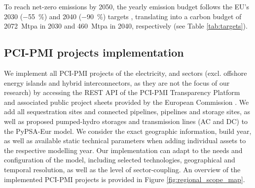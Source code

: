 \documentclass[preprint,12pt,sort&compress]{elsarticle}
\begin{document}
To reach net-zero  emissions by 2050, the yearly emission budget follows the EU's 2030 (\SI{-55}{\percent}) and 2040 (\SI{-90}{\percent}) targets \cite{europeancommissionFit55Delivering2021, europeancommission.directorategeneralforclimateaction.IndepthReportResults2024}, translating into a carbon budget of \SI{2072}{Mtpa} in 2030 and \SI{460}{Mtpa} in 2040, respectively (see Table \ref{tab:targets}).

\subsection{PCI-PMI projects implementation}
\label{sec:pci-pmi_projects_implementation}

We implement all PCI-PMI projects of the electricity,  and  sectors (excl. offshore energy islands and hybrid interconnectors, as they are not the focus of our research) by accessing the REST API of the PCI-PMI Transparency Platform and associated public project sheets provided by the European Commission \cite{europeancommissionPCIPMITransparencyPlatform2024}. We add all  sequestration sites and connected pipelines,  pipelines and storage sites, as well as proposed pumped-hydro storages and transmission lines (AC and DC) to the PyPSA-Eur model. We consider the exact geographic information, build year, as well as available static technical parameters when adding individual assets to the respective modelling year. Our implementation can adapt to the needs and configuration of the model, including selected technologies, geographical and temporal resolution, as well as the level of sector-coupling. An overview of the implemented PCI-PMI projects is provided in Figure \ref{fig:regional_scope_map}.
\end{document}
